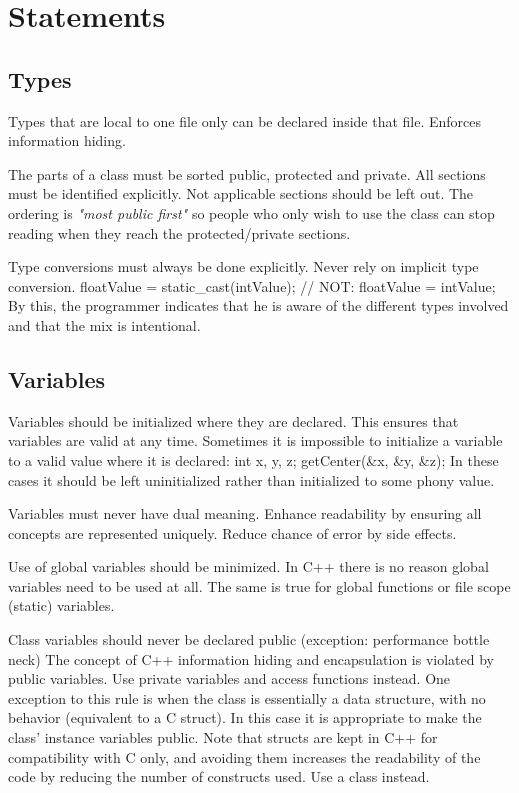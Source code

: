 \section{Statements}
\subsection{Types}

\recommendation
{Types that are local to one file only can be declared inside that file.}
{}
{Enforces information hiding.}

\recommendation
{The parts of a class must be sorted public, protected and private. All sections must be identified explicitly. Not applicable sections should be left out.}
{}
{The ordering is \textit{"most public first"} so people who only wish to use the class can stop reading when they reach the protected/private sections.}

\recommendation
{Type conversions must always be done explicitly. Never rely on implicit type conversion.}
{floatValue = static\_cast(intValue); // NOT: floatValue = intValue;}
{By this, the programmer indicates that he is aware of the different types involved and that the mix is intentional.}

\subsection{Variables}

\recommendation
{Variables should be initialized where they are declared.}
{}
{
	This ensures that variables are valid at any time. Sometimes it is impossible to initialize a variable to a valid value where it is declared:\newline
	int x, y, z;\newline
	getCenter(\&x, \&y, \&z);\newline
	In these cases it should be left uninitialized rather than initialized to some phony value.
}

\recommendation
{Variables must never have dual meaning.}
{}
{Enhance readability by ensuring all concepts are represented uniquely. Reduce chance of error by side effects.}

\recommendation
{Use of global variables should be minimized.}
{}
{In C++ there is no reason global variables need to be used at all. The same is true for global functions or file scope (static) variables.}

\recommendation
{Class variables should never be declared public (exception: performance bottle neck)}
{}
{
	The concept of C++ information hiding and encapsulation is violated by public variables. Use private variables and access functions instead. One exception to this rule is when the class is essentially a data structure, with no behavior (equivalent to a C struct). In this case it is appropriate to make the class' instance variables public.\newline
	Note that structs are kept in C++ for compatibility with C only, and avoiding them increases the readability of the code by reducing the number of constructs used. Use a class instead.
}

